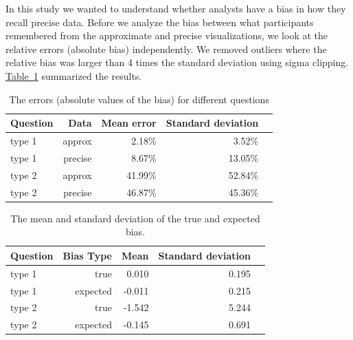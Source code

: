\documentclass[10pt,journal,compsoc]{IEEEtran}
\newcommand{\tabref}[1]{\hyperref[#1]{Table~\ref*{#1}}}
\begin{document}
In this study we wanted to understand whether analysts have a bias in how they recall precise data.
Before we analyze the bias between what participants remembered from the approximate and precise visualizations, we look at the relative errors (absolute bias) independently.
We removed outliers where the relative bias was larger than 4 times the standard deviation using sigma clipping.
\tabref{table_errors} summarized the results.

\begin{table}[!t]
\renewcommand{\arraystretch}{1.3}
\caption{The errors (absolute values of the bias) for different questions}
\label{table_errors}
\centering
\begin{tabular}{|l||r|r|r|r|}
\hline
Question & Data        & Mean error & Standard deviation \\ \hline
\hline
type 1   & approx      & 2.18\%     & 3.52\%             \\ \hline
type 1   & precise     & 8.67\%     & 13.05\%            \\ \hline
type 2   & approx      & 41.99\%    & 52.84\%            \\ \hline
type 2   & precise     & 46.87\%    & 45.36\%            \\ \hline
\end{tabular}
\end{table}


\begin{table}[!t]
\renewcommand{\arraystretch}{1.3}
\caption{The mean and standard deviation of the true and expected bias.}
\label{table_biases}
\centering
\begin{tabular}{|l||r|r|r|r|}
\hline
Question & Bias Type  & Mean  & Standard deviation \\ \hline
\hline
type 1   & true      &  0.010 & 0.195  \\ \hline
type 1   & expected  & -0.011 & 0.215  \\ \hline
type 2   & true      & -1.542 & 5.244  \\ \hline
type 2   & expected  & -0.145 & 0.691  \\ \hline
\end{tabular}
\end{table}
\end{document}
